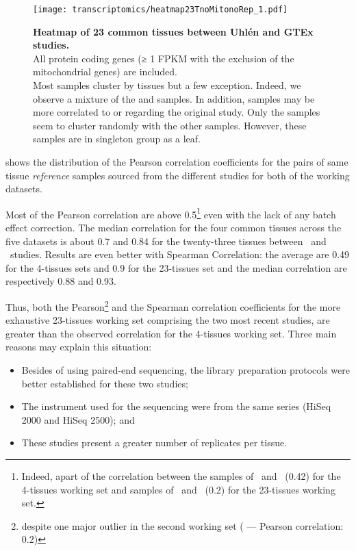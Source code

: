 \begin{figure}[!tpb]
    \texttt{[image: transcriptomics/heatmap23TnoMitonoRep\_1.pdf]}\centering
    \caption[Heatmap of 23 common tissues between Uhlén and GTEx studies]%
    {\label{fig:noMitoNoRep23T}%
    \textbf{Heatmap of 23 common tissues between Uhlén and GTEx studies.}\\
    All protein coding genes (≥ 1 FPKM with the exclusion of the mitochondrial
    genes) are included.\\Most samples cluster by tissues but a few exception.
    Indeed, we observe a mixture of the 
    and  samples.
    In addition,  samples may be more correlated to
     or  regarding the original study.
    Only the  samples seem to cluster randomly with the other
    samples. However, these samples are in singleton group as a leaf.}
\end{figure}

 shows the distribution of the Pearson correlation
coefficients for the pairs of same tissue \emph{reference} samples
sourced from the different studies
for both of the working datasets.

Most of the Pearson correlation are above 0.5\footnote{Indeed, apart of the
correlation between the  samples of \castle\ and \vt\ (0.42)
for the 4-tissues working set and
 samples of \uhlen\ and \gtex\ (0.2)
for the 23-tissues working set.}
even with the lack of any batch effect correction.
The median correlation for the four common tissues across the five datasets is
about 0.7 and 0.84 for the twenty-three tissues between \uhlen\ and \gtex\ studies.
Results are even better with Spearman Correlation:
the average are 0.49 for the 4-tissues sets and 0.9 for the 23-tissues set and
the median correlation are respectively 0.88 and 0.93.

Thus, both the Pearson\footnote{despite one major outlier in the second
working set ( --- Pearson correlation: 0.2)} and the
Spearman correlation coefficients for the more exhaustive 23-tissues working set
comprising the two most recent studies,
are greater than the observed correlation for the 4-tissues working set.
Three main reasons may explain this situation:
\begin{itemize}[topsep=0pt,nosep]
    \item Besides of using paired-end sequencing,
        the library preparation protocols were better established
        for these two studies;
    \item The instrument used for the sequencing were
        from the same series (HiSeq 2000 and HiSeq 2500); and
    \item These studies present a greater number of replicates per tissue.
\end{itemize}

